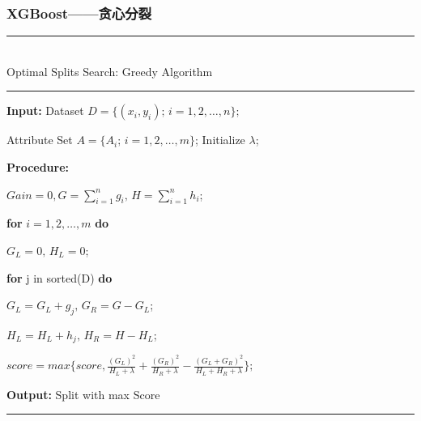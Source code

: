 \documentclass[usenames,dvipsnames]{beamer}
\begin{document}
\begin{frame}
\frametitle{XGBoost——贪心分裂}
\noindent\rule[0.10\baselineskip]{\textwidth}{0.75pt}\\
Optimal Splits Search: Greedy Algorithm\\
\noindent\rule[0.10\baselineskip]{\textwidth}{0.5pt}
    \textbf{Input:} Dataset $D=\{(x_i,y_i);\, i = 1,2,\dots, n\};$\par
    \hspace*{32pt} Attribute Set $A = \{A_i;\,i=1,2,\dots,m\}$; Initialize $\lambda$;\par
    \textbf{Procedure:}\par
    \hspace*{32pt} $Gain = 0, G = \sum_{i=1}^{n}g_i,\,H = \sum_{i=1}^{n}h_i$;\par
    \hspace*{32pt} \textbf{for} $i = 1,2,\dots, m$ \textbf{do}\par
    \hspace*{48pt}  $G_L = 0, \, H_L = 0$;\par
    \hspace*{48pt}  \textbf{for} j in sorted(D) \textbf{do}\par
    \hspace*{64pt}  $G_L = G_L+g_j,\, G_R = G - G_L$;\par
    \hspace*{64pt}  $H_L = H_L+h_j,\, H_R = H - H_L$;\par
    \hspace*{48pt}  $score = max\{score, \frac{(G_L)^2}{H_L+\lambda}+\frac{(G_R)^2}{H_R+\lambda}- \frac{(G_L+G_R)^2}{H_L+H_R+\lambda}\};$\par
    \textbf{Output:} Split with max Score\\
\noindent\rule[0.10\baselineskip]{\textwidth}{0.75pt}\par
\end{frame}
\end{document}
